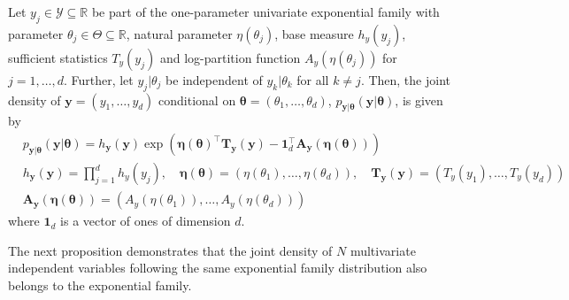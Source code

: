 \begin{proposition}
\label{prop:expfam_form_independent_variables}
    Let $y_j \in \mathcal{Y} \subseteq \mathbb{R}$ be part of the one-parameter univariate exponential family with parameter $\theta_j \in \Theta \subseteq \mathbb{R}$, natural parameter $\eta(\theta_j)$, base measure $h_{y}(y_j)$, sufficient statistics $T_{y}(y_j)$ and log-partition function $A_y(\eta(\theta_j))$ for $j = 1, \ldots, d$. Further, let $y_j|\theta_j$ be independent of $y_k|\theta_k$ for all $k \neq j$. Then, the joint density of $\boldsymbol{y} = (y_1, \ldots, y_d)$ conditional on $\boldsymbol{\theta} = (\theta_1, \ldots, \theta_d)$, $p_{\boldsymbol{y}\vert\boldsymbol{\theta}}(\boldsymbol{y} \vert \boldsymbol{\theta})$, is given by 
    \begin{equation*}
        \begin{aligned}
    &p_{\boldsymbol{y}\vert\boldsymbol{\theta}}(\boldsymbol{y} \vert \boldsymbol{\theta}) = h_{\boldsymbol{y}}(\boldsymbol{y})   \exp \left( \boldsymbol{\eta}(\boldsymbol{\theta})^{\top} \mathbf{T}_{\boldsymbol{y}}(\boldsymbol{y}) - \mathbf{1}_d^\top \mathbf{A}_{\boldsymbol{y}}(\boldsymbol{\eta}(\boldsymbol{\theta})) \right)\\
        &h_{\boldsymbol{y}}(\boldsymbol{y}) = \prod_{j = 1}^d h_{y}(y_j),\quad
        \boldsymbol{\eta}(\boldsymbol{\theta}) = (\eta(\theta_1), \dots, \eta(\theta_d)), \quad
        \mathbf{T}_{\boldsymbol{y}}(\boldsymbol{y}) = (T_y(y_1), \ldots, T_y(y_d)) \\
        &\mathbf{A}_{\boldsymbol{y}}(\boldsymbol{\eta}(\boldsymbol{\theta}))= (A_y(\eta(\theta_1)), \ldots, A_y(\eta(\theta_d)))
            \end{aligned}
    \end{equation*}
    where $\mathbf{1}_d$ is a vector of ones of dimension $d$.
\end{proposition}
The next proposition demonstrates that the joint density of $N$ multivariate independent variables following the same exponential family distribution also belongs to the exponential family. 
